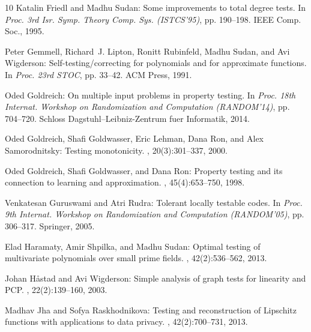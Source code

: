 \documentclass[11pt]{article}
\numberwithin{equation}{section}
\theoremstyle{definition}
\theoremstyle{plain}
\begin{document}
\begin{thebibliography}{10}
{\sc Katalin Friedl and Madhu Sudan}: Some improvements to total degree tests.
\newblock In {\em Proc. 3rd Isr. Symp. Theory Comp. Sys. (ISTCS'95)}, pp.
  190--198. IEEE Comp. Soc., 1995.

{\sc Peter Gemmell, Richard~J. Lipton, Ronitt Rubinfeld, Madhu Sudan, and Avi
  Wigderson}: Self-testing/correcting for polynomials and for approximate
  functions.
\newblock In {\em Proc. 23rd STOC}, pp. 33--42. ACM Press, 1991.
\newblock [\epfmtdoi{10.1145/103418.103429}]

{\sc Oded Goldreich}: On multiple input problems in property testing.
\newblock In {\em Proc. 18th Internat. Workshop on Randomization and
  Computation (RANDOM'14)}, pp. 704--720. Schloss Dagstuhl--Leibniz-Zentrum
  fuer Informatik, 2014.

{\sc Oded Goldreich, Shafi Goldwasser, Eric Lehman, Dana Ron, and Alex
  Samorodnitsky}: Testing monotonicity.
, 20(3):301--337, 2000.
\newblock [\epfmtdoi{10.1007/s004930070011}]

{\sc Oded Goldreich, Shafi Goldwasser, and Dana Ron}: Property testing and its
  connection to learning and approximation.
, 45(4):653--750, 1998.
\newblock [\epfmtdoi{10.1145/285055.285060}]

{\sc Venkatesan Guruswami and Atri Rudra}: Tolerant locally testable codes.
\newblock In {\em Proc. 9th Internat. Workshop on Randomization and Computation
  (RANDOM'05)}, pp. 306--317. Springer, 2005.
\newblock [\epfmtdoi{10.1007/11538462\_26}]

{\sc Elad Haramaty, Amir Shpilka, and Madhu Sudan}: Optimal testing of
  multivariate polynomials over small prime fields.
, 42(2):536--562, 2013.
\newblock [\epfmtdoi{10.1137/120879257}]

{\sc Johan H{\aa}stad and Avi Wigderson}: Simple analysis of graph tests for
  linearity and {PCP}.
, 22(2):139--160, 2003.

{\sc Madhav Jha and Sofya Raskhodnikova}: Testing and reconstruction of
  {Lipschitz} functions with applications to data privacy.
, 42(2):700--731, 2013.
\newblock [\epfmtdoi{10.1137/110840741}]


\end{thebibliography}
\end{document}
